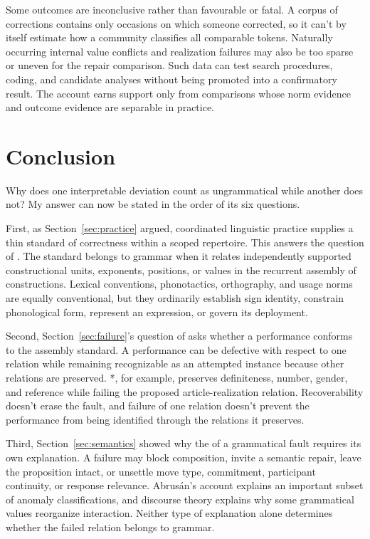\documentclass[12pt,letterpaper]{article}
\begin{document}
Some outcomes are inconclusive rather than favourable or fatal. A corpus of
corrections contains only occasions on which someone corrected, so it can't by
itself estimate how a community classifies all comparable tokens. Naturally
occurring internal value conflicts and realization failures may also be too sparse
or uneven for the repair comparison. Such data can test search procedures, coding,
and candidate analyses without being promoted into a confirmatory result. The
account earns support only from comparisons whose norm evidence and outcome
evidence are separable in practice.


\section{Conclusion}

Why does one interpretable deviation count as ungrammatical while another does
not? My answer can now be stated in the order of its six questions.

First, as Section~\ref{sec:practice} argued, coordinated linguistic practice supplies a thin standard of correctness
within a scoped repertoire. This answers the question of . The standard belongs to grammar when it relates independently
supported constructional units, exponents, positions, or values in the recurrent assembly of
constructions. Lexical conventions, phonotactics, orthography, and usage norms are
equally conventional, but they ordinarily establish sign identity, constrain
phonological form, represent an expression, or govern its deployment.

Second, Section~\ref{sec:failure}'s question of  asks whether a performance conforms to the
assembly standard. A performance can be defective with respect to one relation
while remaining recognizable as an attempted instance because other relations are
preserved. *, for example, preserves definiteness, number, gender,
and reference while failing the proposed article-realization relation.
Recoverability doesn't erase the fault, and failure of one relation doesn't
prevent the performance from being identified through the relations it preserves.

Third, Section~\ref{sec:semantics} showed why the  of a grammatical fault
requires its own explanation. A failure may block composition, invite a semantic
repair, leave the proposition intact, or unsettle move type, commitment,
participant continuity, or response relevance. Abrus\'an's account explains an
important subset of anomaly classifications, and discourse theory explains why
some grammatical values reorganize interaction. Neither type of explanation
alone determines whether the failed relation belongs to grammar.
\end{document}
